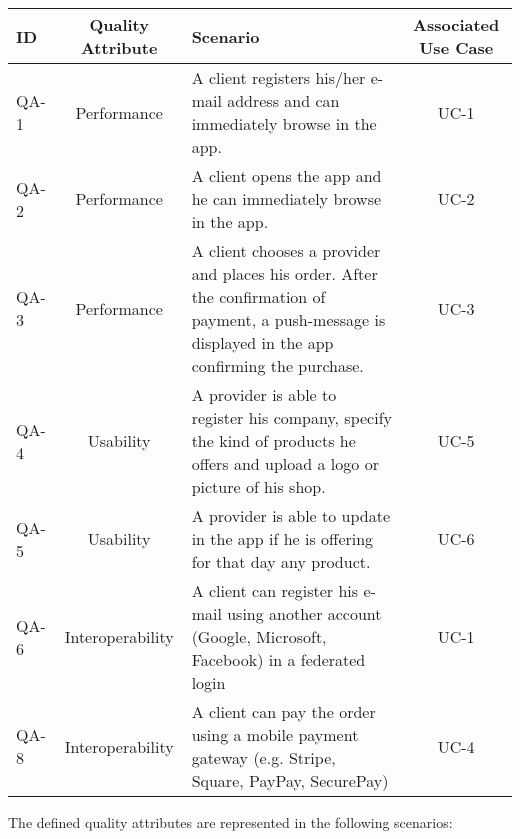 \begin{table}[H]
    \begin{tabularx}{\textwidth}{lcXc}
        \toprule
        ID & Quality Attribute & Scenario & Associated Use Case  \\
        \midrule
        QA-1 & Performance & A \gls{client} registers his/her e-mail address and can immediately browse in the app. & UC-1 \\
        QA-2 & Performance & A \gls{client} opens the app and he can immediately browse in the app. & UC-2 \\
        QA-3 & Performance & A \gls{client} chooses a \gls{provider} and places his order. After the confirmation
        of payment, a push-message is displayed in the app confirming the purchase. & UC-3 \\
        QA-4 & Usability & A \gls{provider} is able to register his company, specify the kind of products he offers and upload
        a logo or picture of his shop. & UC-5 \\
        QA-5 & Usability & A \gls{provider} is able to update in the app if he is offering for that day any product. &  UC-6 \\
        QA-6 & Interoperability & A \gls{client} can register his e-mail using another account (Google, Microsoft, Facebook)
        in a \gls{federated login} & UC-1 \\
        QA-8 & Interoperability & A \gls{client} can pay the order using a \gls{mobile payment gateway} (e.g. Stripe, Square, PayPay, 
        SecurePay) & UC-4 \\
        \bottomrule
    \end{tabularx}
\end{table}

\newpage
The defined quality attributes are represented in the following scenarios:

